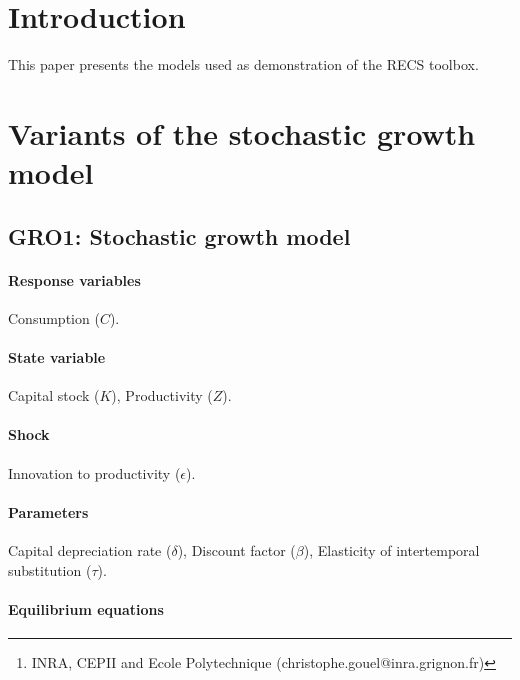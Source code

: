 \documentclass[11pt,fleqn]{article}
\title{}
\date{\today}%
\author{Christophe Gouel\footnote{INRA, CEPII and Ecole Polytechnique
    (christophe.gouel@inra.grignon.fr)}}
\begin{document}
\maketitle

\tableofcontents

\section{Introduction}
\label{sec:introduction}

This paper presents the models used as demonstration of the RECS toolbox.

\section{Variants of the stochastic growth model}
\label{sec:sto-grow}

\subsection{GRO1: Stochastic growth model}
\label{sec:gro1}

\paragraph{Response variables}

Consumption ($C$).

\paragraph{State variable}

Capital stock ($K$), Productivity ($Z$).

\paragraph{Shock}

Innovation to productivity ($\epsilon$).

\paragraph{Parameters}

Capital depreciation rate ($\delta$), Discount factor ($\beta$), Elasticity of
intertemporal substitution ($\tau$).

\paragraph{Equilibrium equations}
\end{document}
